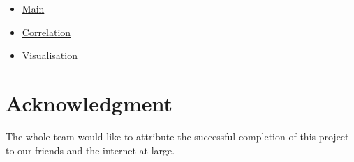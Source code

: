 \documentclass[conference]{IEEEtran}
\begin{document}
\begin{itemize}
\item \href{https://github.com/0thorderlogic/smalldata/blob/main/main.ipynb}{Main}
\item \href{https://github.com/0thorderlogic/smalldata/blob/main/correlation.ipynb}{Correlation}
\item \href{https://github.com/0thorderlogic/smalldata/blob/main/visuals.ipynb}{Visualisation}
\end{itemize}


\section{Acknowledgment}

The whole team would like to attribute the successful completion of this project to our friends and the internet at large.

\section*{}
\end{document}

